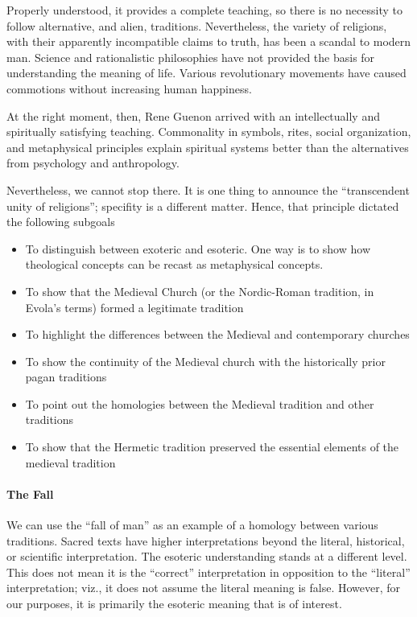 Properly understood, it provides a complete teaching, so there is no necessity to follow alternative, and alien, traditions. Nevertheless, the variety of religions, with their apparently incompatible claims to truth, has been a scandal to modern man. Science and rationalistic philosophies have not provided the basis for understanding the meaning of life. Various revolutionary movements have caused commotions without increasing human happiness.

At the right moment, then, Rene Guenon arrived with an intellectually and spiritually satisfying teaching. Commonality in symbols, rites, social organization, and metaphysical principles explain spiritual systems better than the alternatives from psychology and anthropology.

Nevertheless, we cannot stop there. It is one thing to announce the ``transcendent unity of religions''; specifity is a different matter. Hence, that principle dictated the following subgoals

\begin{itemize}


\item To distinguish between exoteric and esoteric. One way is to show how theological concepts can be recast as metaphysical concepts.

\item To show that the Medieval Church (or the Nordic-Roman tradition, in Evola's terms) formed a legitimate tradition

\item To highlight the differences between the Medieval and contemporary churches

\item To show the continuity of the Medieval church with the historically prior pagan traditions

\item To point out the homologies between the Medieval tradition and other traditions

\item To show that the Hermetic tradition preserved the essential elements of the medieval tradition
\end{itemize}


\paragraph{The Fall}


We can use the ``fall of man'' as an example of a homology between various traditions. Sacred texts have higher interpretations beyond the literal, historical, or scientific interpretation. The esoteric understanding stands at a different level. This does not mean it is the ``correct'' interpretation in opposition to the ``literal'' interpretation; viz., it does not assume the literal meaning is false. However, for our purposes, it is primarily the esoteric meaning that is of interest.

